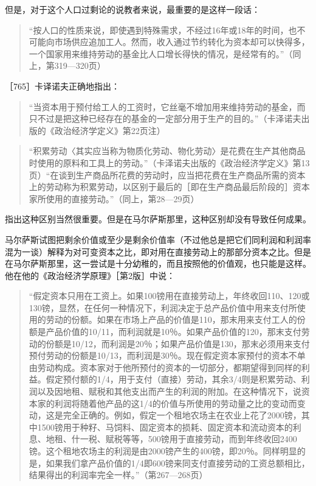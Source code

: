但是，对于这个人口过剩论的说教者来说，最重要的是这样一段话：

\begin{quote}{“按人口的性质来说，即使遇到特殊需求，不经过16年或18年的时间，也不可能向市场供应追加工人。然而，收入通过节约转化为资本却可以快得多，一个国家用来维持劳动的基金比人口增长得快的情况，是经常有的。”（同上，第319—320页）}\end{quote}

［765］卡译诺夫正确地指出：

\begin{quote}{“当资本用于预付给工人的工资时，它丝毫不增加用来维持劳动的基金，而只不过是把这种已经存在的基金的一定部分用于生产的目的。”（卡泽诺夫出版的《政治经济学定义》第22页注）}\end{quote}


\begin{quote}{“积累劳动〈其实应当称为物质化劳动、物化劳动〉是花费在生产其他商品时使用的原料和工具上的劳动。”（卡泽诺夫出版的《政治经济学定义》第13页）“在谈到生产商品所花费的劳动时，应当把花费在生产商品所需的资本上的劳动称为积累劳动，以区别于最后的［即在生产商品最后阶段的］资本家所使用的直接劳动。”（同上，第28—29页）}\end{quote}

指出这种区别当然很重要。但是在马尔萨斯那里，这种区别却没有导致任何成果。

马尔萨斯试图把剩余价值或至少是剩余价值率（不过他总是把它们同利润和利润率混为一谈）解释为对可变资本之比，即对用在直接劳动上的那部分资本之比。但是在马尔萨斯那里，这一尝试是十分幼稚的，而且按照他的价值观，也只能是这样。他在他的《政治经济学原理》［第2版］中说：

\begin{quote}{“假定资本只用在工资上。如果100镑用在直接劳动上，年终收回110、120或130镑，显然，在任何一种情况下，利润决定于总产品价值中用来支付所使用的劳动的份额。如果在市场上产品的价值是110，那末用来支付工人的份额是产品价值的10/11，而利润就是10％。如果产品价值的120，那末支付劳动的份额是10/12，而利润是20％；如果产品价值是130，那末必须用来支付预付劳动的份额是10/13，而利润是30％。现在假定资本家预付的资本不单由劳动构成。资本家对于他所预付的资本的一切部分，都期望得到同样的利益。假定预付额的1/4，用于支付（直接）劳动，其余3/4则是积累劳动、利润以及因地租、赋税和其他支出而产生的利润的附加。在这种情况下，说资本家的利润将随着他产品的这1/4的价值与所使用的劳动量之比的变动而变动，这是完全正确的。例如，假定一个租地农场主在农业上花了2000镑，其中1500镑用于种籽、马饲料、固定资本的损耗、固定资本和流动资本的利息、地租、什一税、赋税等等，500镑用于直接劳动，而到年终收回2400镑。这个租地农场主的利润是由2000镑产生的400镑，即20％。同样明显的是，如果我们拿产品价值的1/4即600镑来同支付直接劳动的工资总额相比，结果得出的利润率完全一样。”（第267—268页）}\end{quote}

